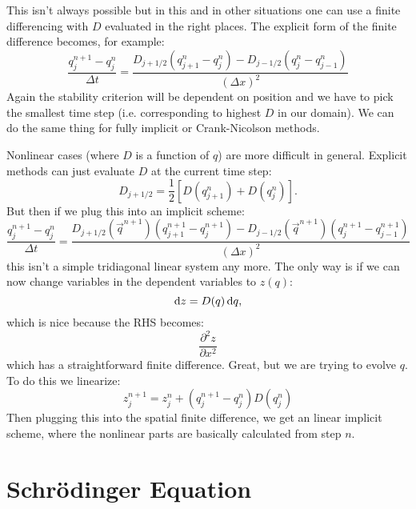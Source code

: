 This isn't always possible but in this and in other situations one can
use a finite differencing with $D$ evaluated in the right places.
The explicit form of the finite difference becomes, for example:
\begin{equation}
 \frac{q_j^{n+1} - q_j^n}{\Delta t}
  = \frac{D_{j+1/2} \left(q_{j+1}^n - q_{j}^n\right) -
  D_{j-1/2} \left(q_j^n - q_{j-1}^n\right)}{(\Delta x)^2}
\end{equation}
Again the stability criterion will be dependent on position and we
have to pick the smallest time step (i.e. corresponding to highest
$D$ in our domain). We can do the same thing for fully implicit or
Crank-Nicolson methods. 

Nonlinear cases (where $D$ is a function of $q$) are more
difficult in general. Explicit methods can just evaluate $D$ at the
current time step:
\begin{equation}
 D_{j+1/2} = \frac{1}{2}\left[D\left(q_{j+1}^n\right) +
 D\left(q_j^n\right)\right].
\end{equation}
But then if we plug this into an implicit scheme:
\begin{equation}
 \frac{q_j^{n+1} - q_j^n}{\Delta t}
  = \frac{D_{j+1/2}\left(\vec{q}^{n+1}\right) \left(q_{j+1}^{n+1} - q_{j}^{n+1}\right) -
  D_{j-1/2}\left(\vec{q}^{n+1}\right) \left(q_j^{n+1} - q_{j-1}^{n+1}\right)}{(\Delta x)^2}
\end{equation}
this isn't a simple tridiagonal linear system any more.  The only way
is if we can now change variables in the dependent variables to
$z(q)$:
\begin{equation}
{\rm d}z = D(q) \,{\rm d}q, 
\end{equation}
which is nice because the RHS becomes:
\begin{equation}
\frac{\partial^2 z}{\partial x^2}
\end{equation}
which has a straightforward finite difference.  Great, but we are
trying to evolve $q$. To do this we linearize:
\begin{equation}
 z_j^{n+1} = z_j^n + \left(q_j^{n+1} - q_j^{n}\right) D\left(q_j^n\right)
\end{equation}
Then plugging this into the spatial finite difference, we get an
linear implicit scheme, where the nonlinear parts are basically
calculated from step $n$.

\section{Schr\"odinger Equation}

